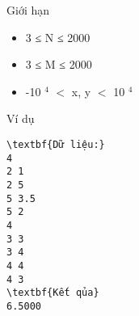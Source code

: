 Giới hạn
\begin{itemize}
	\item     3 ≤ N ≤ 2000   
	\item     3 ≤ M ≤ 2000   
	\item     -10    $^     4    $    $<$ x, y $<$ 10    $^     4    $
\end{itemize}
Ví dụ
\begin{verbatim}
\textbf{Dữ liệu:}
4
2 1 
2 5  
5 3.5  
5 2
4
3 3 
3 4 
4 4 
4 3  
\textbf{Kết qủa}
6.5000
\end{verbatim}